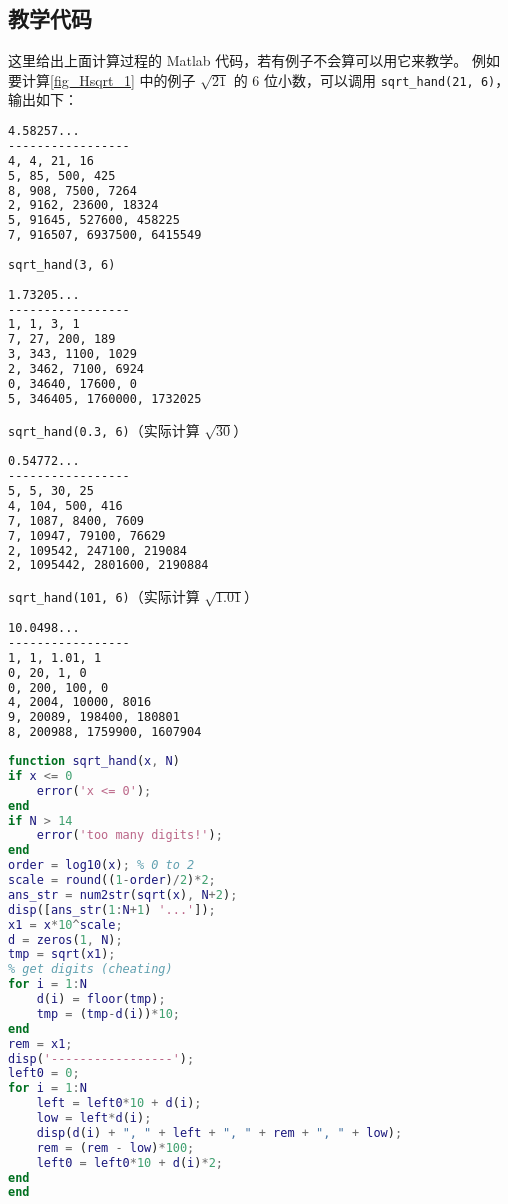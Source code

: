 \subsection{教学代码}
这里给出上面计算过程的 Matlab 代码，若有例子不会算可以用它来教学。 例如要计算\autoref{fig_Hsqrt_1} 中的例子 $\sqrt{21}$ 的 6 位小数，可以调用 \verb|sqrt_hand(21, 6)|， 输出如下：
\begin{lstlisting}[language=bash]
4.58257...
-----------------
4, 4, 21, 16
5, 85, 500, 425
8, 908, 7500, 7264
2, 9162, 23600, 18324
5, 91645, 527600, 458225
7, 916507, 6937500, 6415549
\end{lstlisting}
\verb|sqrt_hand(3, 6)|
\begin{lstlisting}[language=bash]
1.73205...
-----------------
1, 1, 3, 1
7, 27, 200, 189
3, 343, 1100, 1029
2, 3462, 7100, 6924
0, 34640, 17600, 0
5, 346405, 1760000, 1732025
\end{lstlisting}
\verb|sqrt_hand(0.3, 6)|（实际计算 $\sqrt{30}$）
\begin{lstlisting}[language=bash]
0.54772...
-----------------
5, 5, 30, 25
4, 104, 500, 416
7, 1087, 8400, 7609
7, 10947, 79100, 76629
2, 109542, 247100, 219084
2, 1095442, 2801600, 2190884
\end{lstlisting}
\verb|sqrt_hand(101, 6)|（实际计算 $\sqrt{1.01}$）
\begin{lstlisting}[language=bash]
10.0498...
-----------------
1, 1, 1.01, 1
0, 20, 1, 0
0, 200, 100, 0
4, 2004, 10000, 8016
9, 20089, 198400, 180801
8, 200988, 1759900, 1607904
\end{lstlisting}

\begin{lstlisting}[language=matlab,caption=sqrt\_hand.m]
function sqrt_hand(x, N)
if x <= 0
    error('x <= 0');
end
if N > 14
    error('too many digits!');
end
order = log10(x); % 0 to 2
scale = round((1-order)/2)*2;
ans_str = num2str(sqrt(x), N+2);
disp([ans_str(1:N+1) '...']);
x1 = x*10^scale;
d = zeros(1, N);
tmp = sqrt(x1);
% get digits (cheating)
for i = 1:N
    d(i) = floor(tmp);
    tmp = (tmp-d(i))*10;
end
rem = x1;
disp('-----------------');
left0 = 0;
for i = 1:N
    left = left0*10 + d(i);
    low = left*d(i);
    disp(d(i) + ", " + left + ", " + rem + ", " + low);
    rem = (rem - low)*100;
    left0 = left0*10 + d(i)*2;
end
end
\end{lstlisting}
